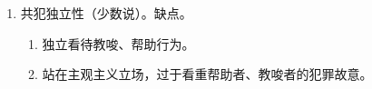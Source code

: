 \begin{enumerate}
\begin{enumerate}
\begin{enumerate}
                  \item 教唆者、帮助者要构成犯罪，必须以实行者构成犯罪为前提。
                  \item 犯罪形态也从属实行者。。
                \end{enumerate}
          \item 共犯独立性（少数说）。缺点。
                \begin{enumerate}
                  \item 独立看待教唆、帮助行为。
                  \item 站在主观主义立场，过于看重帮助者、教唆者的犯罪故意。
                \end{enumerate}
        \end{enumerate}
\end{enumerate}
